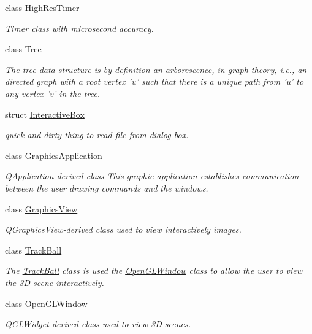 \begin{DoxyCompactItemize}
class \hyperlink{class_d_o_1_1_high_res_timer}{High\-Res\-Timer}
\begin{DoxyCompactList}\small\item\em \hyperlink{class_d_o_1_1_timer}{Timer} class with microsecond accuracy. \end{DoxyCompactList}\item 
class \hyperlink{class_d_o_1_1_tree}{Tree}
\begin{DoxyCompactList}\small\item\em The tree data structure is by definition an arborescence, in graph theory, i.\-e., an directed graph with a root vertex 'u' such that there is a unique path from 'u' to any vertex 'v' in the tree. \end{DoxyCompactList}\item 
struct \hyperlink{struct_d_o_1_1_interactive_box}{Interactive\-Box}
\begin{DoxyCompactList}\small\item\em quick-\/and-\/dirty thing to read file from dialog box. \end{DoxyCompactList}\item 
class \hyperlink{class_d_o_1_1_graphics_application}{Graphics\-Application}
\begin{DoxyCompactList}\small\item\em Q\-Application-\/derived class This graphic application establishes communication between the user drawing commands and the windows. \end{DoxyCompactList}\item 
class \hyperlink{class_d_o_1_1_graphics_view}{Graphics\-View}
\begin{DoxyCompactList}\small\item\em Q\-Graphics\-View-\/derived class used to view interactively images. \end{DoxyCompactList}\item 
class \hyperlink{class_d_o_1_1_track_ball}{Track\-Ball}
\begin{DoxyCompactList}\small\item\em The \hyperlink{class_d_o_1_1_track_ball}{Track\-Ball} class is used the \hyperlink{class_d_o_1_1_open_g_l_window}{Open\-G\-L\-Window} class to allow the user to view the 3\-D scene interactively. \end{DoxyCompactList}\item 
class \hyperlink{class_d_o_1_1_open_g_l_window}{Open\-G\-L\-Window}
\begin{DoxyCompactList}\small\item\em Q\-G\-L\-Widget-\/derived class used to view 3\-D scenes. \end{DoxyCompactList}\item 

\end{DoxyCompactItemize}
